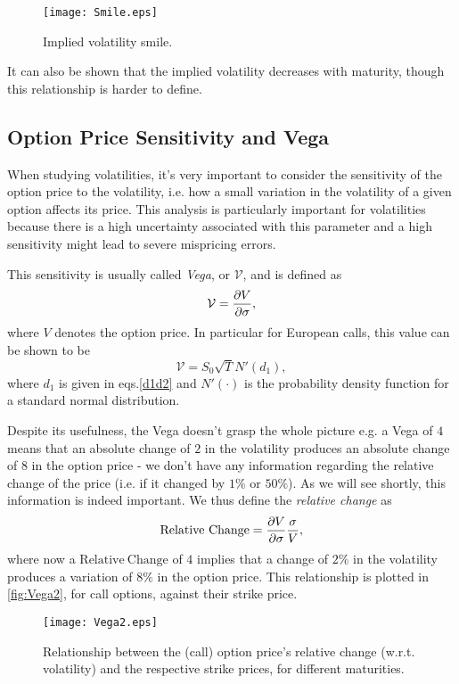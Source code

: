 \begin{figure}[H]
    \centering
      \texttt{[image: Smile.eps]}
      \caption{Implied volatility smile.}\label{fig:Smile}
    \end{figure}
    
It can also be shown that the implied volatility decreases with maturity, though this relationship is harder to define.

\subsection{Option Price Sensitivity and Vega}
When studying volatilities, it's very important to consider the sensitivity of the option price to the volatility, i.e. how a small variation in the volatility of a given option affects its price. This analysis is particularly important for volatilities because there is a high uncertainty associated with this parameter and a high sensitivity might lead to severe mispricing errors.

This sensitivity is usually called \emph{Vega}, or $\mathcal{V}$, and is defined as
\begin{equation}
\mathcal{V}=\pdv{V}{\sigma},
\end{equation}
\noindent where $V$ denotes the option price.
In particular for European calls, this value can be shown to be~\citep{Hull}
\begin{equation}
\mathcal{V}=S_0\sqrt{T}N'(d_1),
\end{equation}
\noindent where $d_1$ is given in eqs.\eqref{d1d2} and $N'(\cdot)$ is the probability density function for a standard normal distribution.

Despite its usefulness, the Vega doesn't grasp the whole picture e.g. a Vega of $4$ means that an absolute change of $2$ in the volatility produces an absolute change of $8$ in the option price - we don't have any information regarding the relative change of the price (i.e. if it changed by $1\%$ or $50\%$).
As we will see shortly, this information is indeed important. We thus define the \emph{relative change} as
\begin{equation}
\mathrm{Relative\ Change}=\pdv{V}{\sigma}\frac{\sigma}{V},
\end{equation}
\noindent where now a $\mathrm{Relative\ Change}$ of $4$ implies that a change of $2\%$ in the volatility produces a variation of $8\%$ in the option price. This relationship is plotted in \autoref{fig:Vega2}, for call options, against their strike price.
\begin{figure}[H]
    \centering
      \texttt{[image: Vega2.eps]}
      \caption{Relationship between the (call) option price's relative change (w.r.t. volatility) and the respective strike prices, for different maturities.}\label{fig:Vega2}
    \end{figure}

